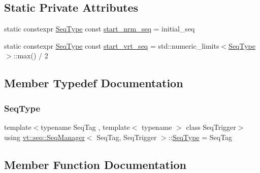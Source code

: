 \subsection*{Static Private Attributes}
\begin{DoxyCompactItemize}
\item 
static constexpr \hyperlink{structvt_1_1seq_1_1_seq_manager_a46a40595599aa666e9cf9f46ee30cfde}{Seq\+Type} const \hyperlink{structvt_1_1seq_1_1_seq_manager_a71ef8ed323c68ade7d3b46b99c81846d}{start\+\_\+nrm\+\_\+seq} = initial\+\_\+seq
\item 
static constexpr \hyperlink{structvt_1_1seq_1_1_seq_manager_a46a40595599aa666e9cf9f46ee30cfde}{Seq\+Type} const \hyperlink{structvt_1_1seq_1_1_seq_manager_aae6446338964093292b8dcaa79d77f96}{start\+\_\+vrt\+\_\+seq} = std\+::numeric\+\_\+limits$<$\hyperlink{structvt_1_1seq_1_1_seq_manager_a46a40595599aa666e9cf9f46ee30cfde}{Seq\+Type}$>$\+::max() / 2
\end{DoxyCompactItemize}


\subsection{Member Typedef Documentation}
\mbox{\label{structvt_1_1seq_1_1_seq_manager_a46a40595599aa666e9cf9f46ee30cfde}} 
\subsubsection{\texorpdfstring{Seq\+Type}{SeqType}}
{\footnotesize\ttfamily template$<$typename Seq\+Tag , template$<$ typename $>$ class Seq\+Trigger$>$ \\
using \hyperlink{structvt_1_1seq_1_1_seq_manager}{vt\+::seq\+::\+Seq\+Manager}$<$ Seq\+Tag, Seq\+Trigger $>$\+::\hyperlink{structvt_1_1seq_1_1_seq_manager_a46a40595599aa666e9cf9f46ee30cfde}{Seq\+Type} =  Seq\+Tag}



\subsection{Member Function Documentation}
\mbox{\label{structvt_1_1seq_1_1_seq_manager_a9a5b739e65924f54a962b75435e53dd3}} 

